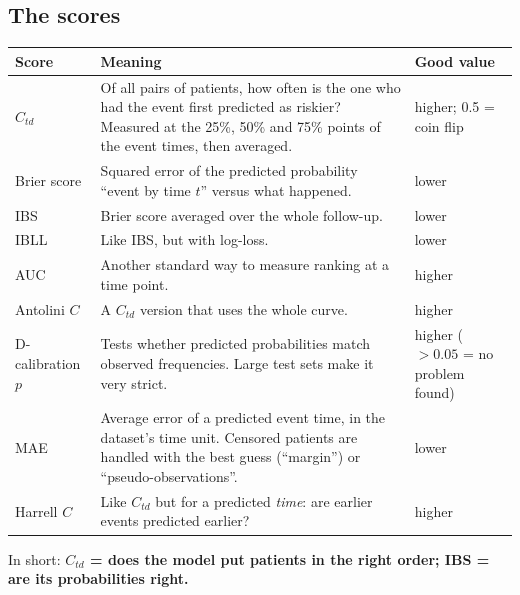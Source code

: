 \documentclass[11pt]{article}
\begin{document}
\subsection{The scores}
\begin{table}[H]
\centering
\begin{tabularx}{\textwidth}{lYl}
\toprule
Score & Meaning & Good value \\
\midrule
$C_{td}$ & Of all pairs of patients, how often is the one who had the event first predicted as riskier?
  Measured at the 25\%, 50\% and 75\% points of the event times, then averaged. & higher; 0.5 = coin flip \\
Brier score & Squared error of the predicted probability ``event by time $t$'' versus what happened. & lower \\
IBS & Brier score averaged over the whole follow-up. & lower \\
IBLL & Like IBS, but with log-loss. & lower \\
AUC & Another standard way to measure ranking at a time point. & higher \\
Antolini $C$ & A $C_{td}$ version that uses the whole curve. & higher \\
D-calibration $p$ & Tests whether predicted probabilities match observed frequencies. Large test sets make it
  very strict. & higher ($>0.05$ = no problem found) \\
MAE & Average error of a predicted event time, in the dataset's time unit. Censored patients are handled
  with the best guess (``margin'') or ``pseudo-observations''. & lower \\
Harrell $C$ & Like $C_{td}$ but for a predicted \emph{time}: are earlier events predicted earlier? & higher \\
\bottomrule
\end{tabularx}
\end{table}
In short: \textbf{$C_{td}$ = does the model put patients in the right order; IBS = are its
probabilities right.}

\end{document}
